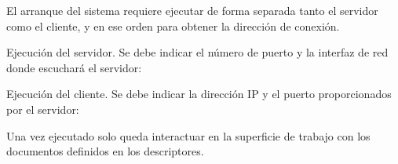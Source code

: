 El arranque del sistema requiere ejecutar de forma separada tanto el servidor como el cliente, y en
ese orden para obtener la dirección de conexión.

Ejecución del servidor. Se debe indicar el número de puerto y la interfaz de red donde escuchará el
servidor:

\begin{listing}[%
  style=consola]
$ ./argos_server <port> <iface>}
\end{listing}

Ejecución del cliente. Se debe indicar la dirección IP y el puerto proporcionados por el
servidor:


Una vez ejecutado solo queda interactuar en la superficie de trabajo con los documentos definidos
en los descriptores.

